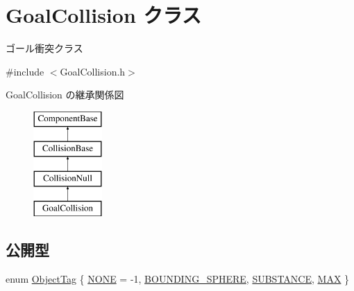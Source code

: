 \hypertarget{class_goal_collision}{}\section{Goal\+Collision クラス}
\label{class_goal_collision}


ゴール衝突クラス  




{\ttfamily \#include $<$Goal\+Collision.\+h$>$}

Goal\+Collision の継承関係図\begin{figure}[H]
\begin{center}
\leavevmode
\includegraphics[height=4.000000cm]{class_goal_collision}
\end{center}
\end{figure}
\subsection*{公開型}
\begin{DoxyCompactItemize}
\item 
enum \mbox{\hyperlink{class_goal_collision_a8d0d760973816d9086df90491f38ff62}{Object\+Tag}} \{ \mbox{\hyperlink{class_goal_collision_a8d0d760973816d9086df90491f38ff62ad664dba1ab9212a7a0c29f3d113f74ba}{N\+O\+NE}} = -\/1, 
\mbox{\hyperlink{class_goal_collision_a8d0d760973816d9086df90491f38ff62ac2036d06505fcf67ddd968f97179789d}{B\+O\+U\+N\+D\+I\+N\+G\+\_\+\+S\+P\+H\+E\+RE}}, 
\mbox{\hyperlink{class_goal_collision_a8d0d760973816d9086df90491f38ff62a99519b2786b3bc408ca13eda97606b81}{S\+U\+B\+S\+T\+A\+N\+CE}}, 
\mbox{\hyperlink{class_goal_collision_a8d0d760973816d9086df90491f38ff62ac8b39f34903a130505e1c485f7667e07}{M\+AX}}
 \}
\end{DoxyCompactItemize}
